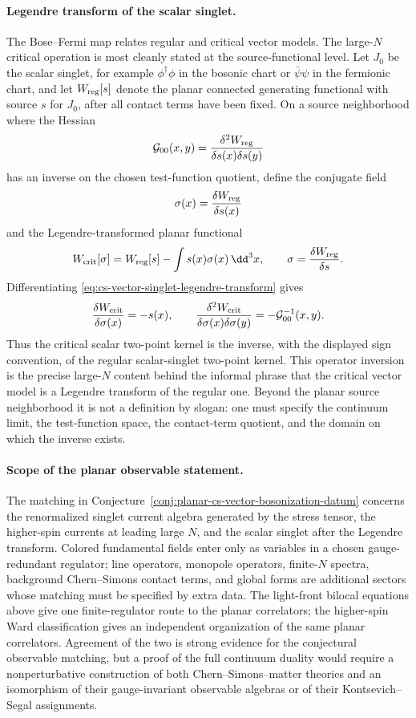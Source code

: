 \paragraph{Legendre transform of the scalar singlet.}
The Bose--Fermi map relates regular and critical vector models.  The
large-\(N\) critical operation is most cleanly stated at the source-functional
level.  Let \(J_0\) be the scalar singlet, for example
\(\phi^\dagger\phi\) in the bosonic chart or \(\bar\psi\psi\) in the
fermionic chart, and let \(W_{\rm reg}[s]\) denote the planar connected
generating functional with source \(s\) for \(J_0\), after all contact terms
have been fixed.  On a source neighborhood where the Hessian
\[
  \mathcal G_{00}(x,y)
  =
  \frac{\delta^2 W_{\rm reg}}{\delta s(x)\delta s(y)}
\]
has an inverse on the chosen test-function quotient, define the conjugate
field
\[
  \sigma(x)=\frac{\delta W_{\rm reg}}{\delta s(x)}
\]
and the Legendre-transformed planar functional
\begin{equation}
  W_{\rm crit}[\sigma]
  =
  W_{\rm reg}[s]-\int s(x)\sigma(x)\,\dd^3x,
  \qquad
  \sigma=\frac{\delta W_{\rm reg}}{\delta s}.
  \label{eq:cs-vector-singlet-legendre-transform}
\end{equation}
Differentiating \eqref{eq:cs-vector-singlet-legendre-transform} gives
\[
  \frac{\delta W_{\rm crit}}{\delta\sigma(x)}=-s(x),
  \qquad
  \frac{\delta^2W_{\rm crit}}{\delta\sigma(x)\delta\sigma(y)}
  =
  -\mathcal G_{00}^{-1}(x,y).
\]
Thus the critical scalar two-point kernel is the inverse, with the displayed
sign convention, of the regular scalar-singlet two-point kernel.  This
operator inversion is the precise large-\(N\) content behind the informal
phrase that the critical vector model is a Legendre transform of the regular
one.  Beyond the planar source neighborhood it is not a definition by
slogan: one must specify the continuum limit, the test-function space, the
contact-term quotient, and the domain on which the inverse exists.

\paragraph{Scope of the planar observable statement.}
The matching in
Conjecture~\ref{conj:planar-cs-vector-bosonization-datum} concerns the
renormalized singlet current algebra generated by the stress tensor, the
higher-spin currents at leading large \(N\), and the scalar singlet after the
Legendre transform.  Colored fundamental fields enter only as variables in a
chosen gauge-redundant regulator; line operators, monopole operators,
finite-\(N\) spectra, background Chern--Simons contact terms, and global
forms are additional sectors whose matching must be specified by extra data.
The light-front bilocal equations above give one finite-regulator route to
the planar correlators; the higher-spin Ward classification gives an
independent organization of the same planar correlators.  Agreement of the two is
strong evidence for the conjectural observable matching, but a proof of the
full continuum duality would require a nonperturbative construction of both
Chern--Simons--matter theories and an isomorphism of their gauge-invariant
observable algebras or of their Kontsevich--Segal assignments.

